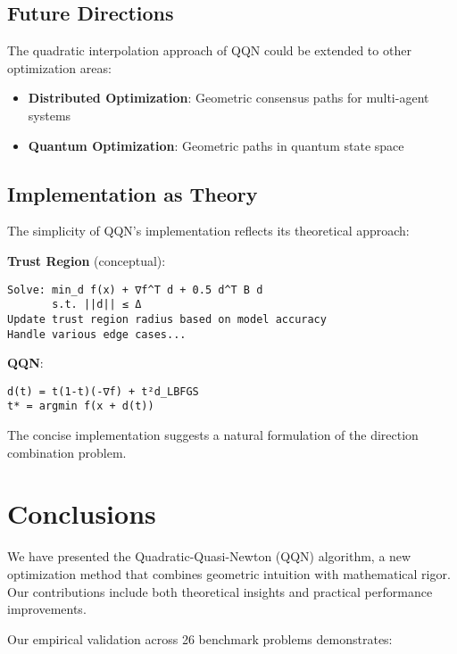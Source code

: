 \hypertarget{future-directions}{%
\subsection{Future Directions}\label{future-directions}}

The quadratic interpolation approach of QQN could be extended to other optimization areas:

\begin{itemize}
\tightlist
\item
  \textbf{Distributed Optimization}: Geometric consensus paths for multi-agent systems
\item
  \textbf{Quantum Optimization}: Geometric paths in quantum state space
\end{itemize}

\hypertarget{implementation-as-theory}{%
\subsection{Implementation as Theory}\label{implementation-as-theory}}

The simplicity of QQN's implementation reflects its theoretical approach:

\textbf{Trust Region} (conceptual):

\begin{verbatim}
Solve: min_d f(x) + ∇f^T d + 0.5 d^T B d
       s.t. ||d|| ≤ Δ
Update trust region radius based on model accuracy
Handle various edge cases...
\end{verbatim}

\textbf{QQN}:

\begin{verbatim}
d(t) = t(1-t)(-∇f) + t²d_LBFGS
t* = argmin f(x + d(t))
\end{verbatim}

The concise implementation suggests a natural formulation of the direction combination problem.

\hypertarget{conclusions}{%
\section{Conclusions}\label{conclusions}}

We have presented the Quadratic-Quasi-Newton (QQN) algorithm, a new optimization method that combines geometric
intuition with mathematical rigor. Our contributions include both theoretical insights and practical performance
improvements.

Our empirical validation across 26 benchmark problems demonstrates:

